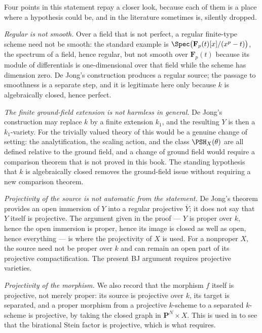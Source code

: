 Four points in this statement repay a closer look, because each of them is a
place where a hypothesis could be, and in the literature sometimes is,
silently dropped.

\emph{Regular is not smooth.}  Over a field that is not perfect, a regular
finite-type scheme need not be smooth: the standard example is
$\Spec\bigl(\mathbf F_p(t)[x]/(x^p-t)\bigr)$, the spectrum of a field,
hence regular, but not smooth over $\mathbf F_p(t)$ because its module of
differentials is one-dimensional over that field while the scheme has
dimension zero.  De Jong's construction produces a regular source; the
passage to smoothness is a separate step, and it is legitimate here only
because $k$ is algebraically closed, hence perfect.

\emph{The finite ground-field extension is not harmless in general.}
De Jong's construction may replace $k$ by a finite extension $k_1$, and
the resulting $Y$ is then a $k_1$-variety.  For the trivially valued
theory of  this would be a genuine change of setting: the
analytification, the scaling action, and the class $\PSH_X(\theta)$ are all
defined relative to the ground field, and a change of ground field would
require a comparison theorem that is not proved in this book.  The standing
hypothesis that $k$ is algebraically closed removes the ground-field
issue without requiring a new comparison theorem.

\emph{Projectivity of the source is not automatic from the statement.}
De Jong's theorem provides an open immersion of $Y$ into a regular
projective $\overline Y$; it does not say that $Y$ itself is projective.
The argument given in the proof --- $Y$ is proper over $k$, hence the
open immersion is proper, hence its image is closed as well as open, hence
everything --- is where the projectivity of $X$ is used.  For a nonproper $X$, the source need not be proper over $k$ and can
remain an open part of its projective compactification.
The present BJ argument requires projective varieties.

\emph{Projectivity of the morphism.}  We also record that the morphism
$f$ itself is projective, not merely proper: its source is projective over
$k$, its target is separated, and a proper morphism from a projective
$k$-scheme to a separated $k$-scheme is projective, by taking the closed
graph in $\mathbf P^N\times X$.  This is used in
 to see that the birational Stein factor is
projective, which is what  requires.

